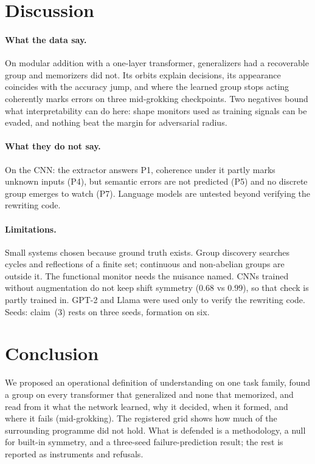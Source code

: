 \documentclass[11pt]{article}
\begin{document}
\section{Discussion}
\paragraph{What the data say.} On modular addition with a one-layer transformer, generalizers had a recoverable group and memorizers did not. Its orbits explain decisions, its appearance coincides with the accuracy jump, and where the learned group stops acting coherently marks errors on three mid-grokking checkpoints. Two negatives bound what interpretability can do here: shape monitors used as training signals can be evaded, and nothing beat the margin for adversarial radius.
\paragraph{What they do not say.} On the CNN: the extractor answers P1, coherence under it partly marks unknown inputs (P4), but semantic errors are not predicted (P5) and no discrete group emerges to watch (P7). Language models are untested beyond verifying the rewriting code.
\paragraph{Limitations.} Small systems chosen because ground truth exists. Group discovery searches cycles and reflections of a finite set; continuous and non-abelian groups are outside it. The functional monitor needs the nuisance named. CNNs trained without augmentation do not keep shift symmetry ($0.68$ vs $0.99$), so that check is partly trained in. GPT-2 and Llama were used only to verify the rewriting code. Seeds: claim~(3) rests on three seeds, formation on six.

\section{Conclusion}
We proposed an operational definition of understanding on one task family, found a group on every transformer that generalized and none that memorized, and read from it what the network learned, why it decided, when it formed, and where it fails (mid-grokking). The registered grid shows how much of the surrounding programme did not hold. What is defended is a methodology, a null for built-in symmetry, and a three-seed failure-prediction result; the rest is reported as instruments and refusals.



\end{document}
